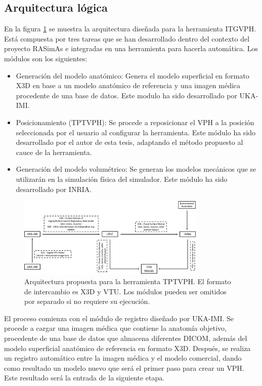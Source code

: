\subsection{Arquitectura lógica}
\label{rasim:arq}
En la figura \ref{fig:toolarq} se muestra la arquitectura diseñada para la herramienta \ac{ITGVPH}.  Está compuesta por tres tareas que se han desarrollado dentro del contexto del proyecto \ac{RASimAs} e integradas en una herramienta para hacerla automática. Los módulos son los siguientes: 
\begin{itemize}
    \item Generación del modelo anatómico:
    Genera el modelo superficial en formato \ac{X3D} en base a un modelo anatómico de referencia y una imagen médica procedente de una base de datos. Este modulo ha sido desarrollado por \ac{UKA-IMI}.
    \item Posicionamiento (\ac{TPTVPH}):
    Se procede a reposicionar el \ac{VPH} a la posición seleccionada por el usuario al configurar la herramienta. Este módulo ha sido desarrollado por el autor de esta tesis, adaptando el método propuesto al cauce de la herramienta.
    \item Generación del modelo volumétrico:
    Se generan los modelos mecánicos que se utilizarán en la simulación física del simulador. Este módulo ha sido desarrollado por \ac{INRIA}.
\end{itemize}

\begin{figure}
    \centering
    \includegraphics[width=0.8\textwidth]{IMG/toolkitarq.png}
    \caption{Arquitectura propuesta para la herramienta \ac{TPTVPH}. El formato de intercambio es \ac{X3D} y \ac{VTU}. Los módulos pueden ser omitidos por separado si no requiere su ejecución.}
    \label{fig:toolarq}
\end{figure}

El proceso comienza con el módulo de registro diseñado por \ac{UKA-IMI}. Se procede a cargar una imagen médica que contiene la anatomía objetivo, procedente de una base de datos que almacena diferentes \ac{DICOM}, además del modelo superficial anatómico de referencia en formato \ac{X3D}. Después, se realiza un registro automático entre la imagen médica y el modelo comercial, dando como resultado un modelo nuevo que será el primer paso para crear un \ac{VPH}. Este resultado será la entrada de la siguiente etapa.

